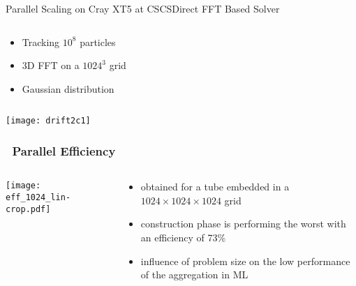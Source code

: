 \documentclass[xcolor=pdftex,table,10pt,yellow,mathserif]{beamer}
\begin{document}
\begin{frame}{\opal Parallel Scaling on Cray XT5 at CSCS}{Direct FFT Based Solver}
 \vspace{-3mm}  
   \begin{columns}
    \begin{column}{11.0cm}
      \scriptsize
        \begin{itemize}
       \item Tracking $10^8$ particles 
        \item 3D FFT on a $1024^3$ grid
        \item Gaussian distribution
       \end{itemize}
    
        
    
    \end{column}
   
  \end{columns}
  \vspace{-5mm}
  \texttt{[image: drift2c1]}
\end{frame}


\begin{frame}
		\frametitle{\oursolver\ Parallel Efficiency}
		
		\begin{columns}
		\begin{column}{6.5cm}
            \centering
		        \texttt{[image: eff\_1024\_lin-crop.pdf]}
        \end{column}
        \begin{column}{4.5cm}
            \begin{itemize} 
                \item obtained for a tube embedded in a $1024\times1024\times1024$ grid
                \item construction phase is performing the worst with an efficiency of 73\%
                \item influence of problem size on the low performance of the aggregation in ML
            \end{itemize}
        \end{column}
        \end{columns}

	\end{frame}
\end{document}
